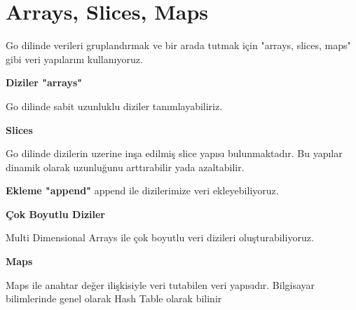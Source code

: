 \section{Arrays, Slices, Maps}
\vspace{5mm}

Go dilinde verileri gruplandırmak ve bir arada tutmak için "arrays, slices, maps" gibi veri yapılarını kullanıyoruz. 
\vspace{10mm}

\textbf{Diziler "arrays"}
\vspace{5mm}

Go dilinde sabit uzunluklu diziler tanımlayabiliriz.
\vspace{5mm}




\vspace{10mm}
\textbf{Slices}
\vspace{5mm}

Go dilinde dizilerin uzerine inşa edilmiş slice yapısı bulunmaktadır. Bu yapılar dinamik olarak uzunluğunu arttırabilir yada azaltabilir.
\vspace{5mm}



\vspace{20mm}
\textbf{Ekleme "append"} append ile dizilerimize veri ekleyebiliyoruz.
\vspace{5mm}



\vspace{10mm}
\textbf{Çok Boyutlu Diziler}
\vspace{5mm}

Multi Dimensional Arrays ile çok boyutlu veri dizileri oluşturabiliyoruz.
\vspace{5mm}



\vspace{20mm}
\textbf{Maps}
\vspace{5mm}

Maps ile anahtar değer ilişkisiyle veri tutabilen veri yapısıdır. Bilgisayar bilimlerinde genel olarak Hash Table olarak bilinir
\vspace{5mm}



